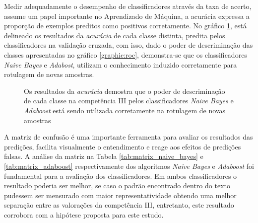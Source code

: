 Medir adequadamente o desempenho de classificadores através da taxa de acerto, 
assume um papel importante no Aprendizado de Máquina, a acurácia expressa a 
proporção de exemplos preditos como positivos corretamente. No gráfico 
\ref{graphic:acuracia}, está delineado os resultados da \textit{acurácia} de 
cada classe distinta, predita pelos classificadores na validação cruzada, com 
isso, dado o poder de descriminação das classes apresentadas no gráfico 
\ref{graphic:roc}, demonstra-se que os classificadores \textit{Naive Bayes} e 
\textit{Adabost}, utilizam o conhecimento induzido corretamente para 
rotulagem de novas amostras.

\begin{figure}[H]
    \begin{center}
    \end{center}
    \caption{Os resultados da \textit{acurácia} demostra que o poder de 
    descriminação de cada classe na competência III pelos classificadores 
    \textit{Naive Bayes} e \textit{Adaboost} está sendo utilizada corretamente 
    na rotulagem de novas amostras}
    \label{graphic:acuracia}
\end{figure}

A matriz de confusão é uma importante ferramenta para avaliar os resultados das 
predições, facilita visualmente o entendimento e reage aos efeitos de predições 
falsas. A análise da matriz na Tabela \ref{tab:matrix_naive_bayes} e 
\ref{tab:matrix_adaboost} respectivamente dos algoritmos \textit{Naive Bayes} e 
\textit{Adaboost} foi fundamental para a avaliação dos classificadores. Em 
ambos classificadores o resultado poderia ser melhor, se caso o padrão 
encontrado dentro do texto pudessem ser mensurado com maior representatividade 
obtendo uma melhor separação entre as valorações da competência III, 
entretanto, este resultado corrobora com a hipótese proposta para este estudo.



